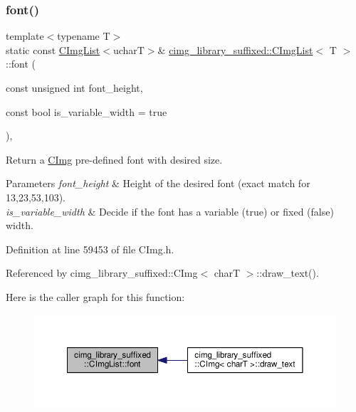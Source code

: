 \subsubsection{\texorpdfstring{font()}{font()}}
{\footnotesize\ttfamily template$<$typename T$>$ \\
static const \hyperlink{structcimg__library__suffixed_1_1CImgList}{C\+Img\+List}$<$ucharT$>$\& \hyperlink{structcimg__library__suffixed_1_1CImgList}{cimg\+\_\+library\+\_\+suffixed\+::\+C\+Img\+List}$<$ T $>$\+::font (\begin{DoxyParamCaption}\item[{const unsigned int}]{font\+\_\+height,  }\item[{const bool}]{is\+\_\+variable\+\_\+width = {\ttfamily true} }\end{DoxyParamCaption})\hspace{0.3cm}{\ttfamily [inline]}, {\ttfamily [static]}}



Return a \hyperlink{structcimg__library__suffixed_1_1CImg}{C\+Img} pre-\/defined font with desired size. 


\begin{DoxyParams}{Parameters}
{\em font\+\_\+height} & Height of the desired font (exact match for 13,23,53,103). \\
\hline
{\em is\+\_\+variable\+\_\+width} & Decide if the font has a variable ({\ttfamily true}) or fixed ({\ttfamily false}) width. \\
\hline
\end{DoxyParams}


Definition at line 59453 of file C\+Img.\+h.



Referenced by cimg\+\_\+library\+\_\+suffixed\+::\+C\+Img$<$ char\+T $>$\+::draw\+\_\+text().

Here is the caller graph for this function\+:
\nopagebreak
\begin{figure}[H]
\begin{center}
\leavevmode
\includegraphics[width=350pt]{d5/d7e/structcimg__library__suffixed_1_1CImgList_aeb4a6463a473fa5935f69534ca1a49c8_icgraph}
\end{center}
\end{figure}
\mbox{\label{structcimg__library__suffixed_1_1CImgList_a0742de5c028207997d91cd6599262ef9}} 
